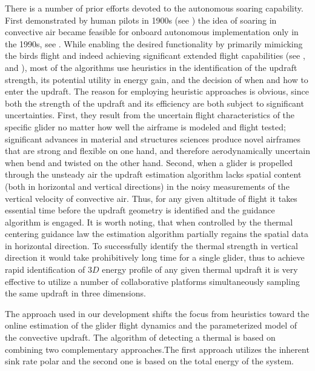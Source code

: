 \documentclass{ifacconf}
\begin{document}
There is a number of prior efforts devoted to the autonomous soaring capability. First demonstrated by human pilots in 1900s (see \cite{Simons:1998}) the idea of soaring in convective air became feasible for onboard autonomous implementation only in the 1990s, see \cite{Wharington:1998}. While enabling the desired functionality by primarily mimicking the birds flight and indeed achieving significant extended flight capabilities (see \cite{Edwards:2008}, \cite{Allen:2006} and \cite{Allen:2007}), most of the algorithms use heuristics in the identification of the updraft strength, its potential utility in energy gain, and the decision of when and how to enter the updraft. The reason for employing heuristic approaches is obvious, since both the strength of the updraft and its efficiency are both subject to significant uncertainties. First, they result from the uncertain flight characteristics of the specific glider no matter how well the airframe is modeled and flight tested; significant advances in material and structures sciences produce novel airframes that are strong and flexible on one hand, and therefore aerodynamically uncertain when bend and twisted on the other hand. Second, when a glider is propelled through the unsteady air the updraft estimation algorithm lacks spatial content (both in horizontal and vertical directions) in the noisy measurements of the vertical velocity of convective air. Thus, for any given altitude of flight it takes essential time before the updraft geometry is identified and the guidance algorithm is engaged. It is worth noting, that when controlled by the thermal centering guidance law the estimation algorithm partially regains the spatial data in horizontal direction. To successfully identify the thermal strength in vertical direction it would take prohibitively long time for a single glider, thus to achieve rapid identification of $3D$ energy profile of any given thermal updraft it is very effective to utilize a number of collaborative platforms simultaneously sampling the same updraft in three dimensions.

The approach used in our development shifts the focus from heuristics toward the online estimation of the glider flight dynamics and the parameterized model of the convective updraft. The algorithm of detecting a thermal is based on combining two complementary approaches.The first approach utilizes the inherent sink rate polar and the second one is based on the total energy of the system.

\end{document}
